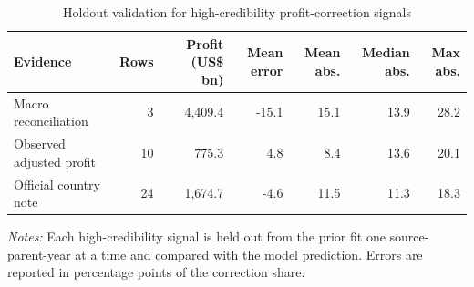 \begin{table}[H]
\centering
\footnotesize
\setlength{\tabcolsep}{3pt}
\caption{Holdout validation for high-credibility profit-correction signals}
\label{tab:profit_correction_validation_holdout}
\begin{tabular}{@{}lrrrrrr@{}}
\toprule
Evidence & Rows & Profit (US\$ bn) & Mean error & Mean abs. & Median abs. & Max abs. \\
\midrule
Macro reconciliation &  3 & 4,409.4 & -15.1 & 15.1 & 13.9 & 28.2 \\
Observed adjusted profit & 10 &   775.3 &   4.8 &  8.4 & 13.6 & 20.1 \\
Official country note & 24 & 1,674.7 &  -4.6 & 11.5 & 11.3 & 18.3 \\
\bottomrule
\end{tabular}

\vspace{0.35em}
\noindent\begin{minipage}{\textwidth}
\footnotesize\raggedright\textit{Notes:} Each high-credibility signal is held out from the prior fit one source-parent-year at a time and compared with the model prediction. Errors are reported in percentage points of the correction share.
\end{minipage}
\end{table}
